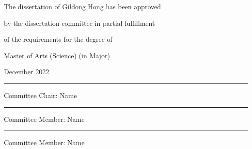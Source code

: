 \documentclass[11pt]{report}
\numberwithin{figure}{section}
\theoremstyle{plain}
\theoremstyle{definition}
\theoremstyle{corollary}
\theoremstyle{definition}
\theoremstyle{plain}
\theoremstyle{definition}
\theoremstyle{plain}
\begin{document}
\newpage
\begin{center}
\Large
The dissertation of Gildong Hong has been approved \par
by the dissertation committee in partial fulfillment\par
of the requirements for the degree of \par
Master of Arts (Science) (in Major) 

\par\vspace{50pt}

\large December 2022

\par\vspace{50pt}

\rule{.6\textwidth}{0.4pt}\par
Committee Chair: Name

\par\vspace{20pt}
 
\rule{.6\textwidth}{0.4pt}\par
Committee Member: Name
 
\par\vspace{20pt}

\rule{.6\textwidth}{0.4pt}\par
Committee Member: Name 
\end{center}
\end{document}
